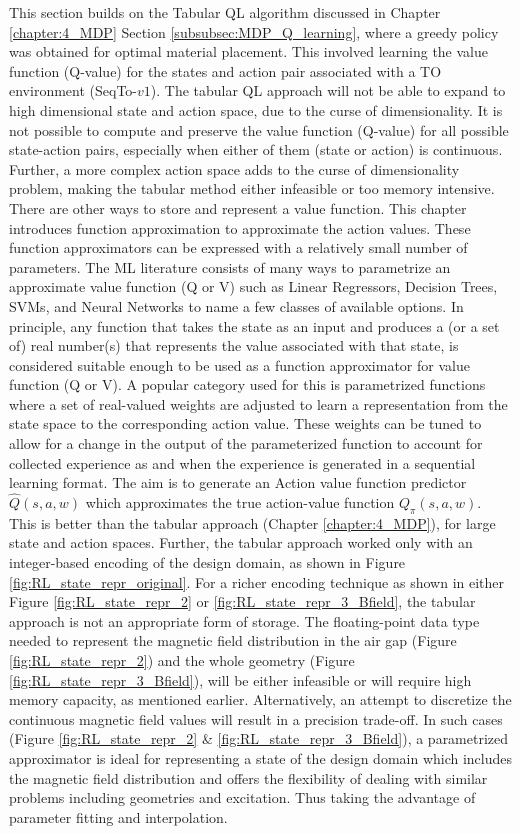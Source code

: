 This section builds on the Tabular QL algorithm discussed in Chapter \ref{chapter:4_MDP} Section \ref{subsubsec:MDP_Q_learning}, where a greedy policy was obtained for optimal material placement. This involved learning the value function (Q-value) for the states and action pair associated with a TO environment (SeqTo-$v1$). The tabular QL approach will not be able to expand to high dimensional state and action space, due to the curse of dimensionality. It is not possible to compute and preserve the  value function (Q-value) for all possible state-action pairs, especially when either of them (state or action) is continuous. Further, a more complex action space adds to the curse of dimensionality problem, making the tabular method either infeasible or too memory intensive. There are other ways to store and represent a value function. This chapter introduces function approximation to approximate the action values. These function approximators can be expressed with a relatively small number of parameters.  The ML literature consists of many ways to parametrize an approximate value function (Q or V) such as Linear Regressors, Decision Trees, SVMs, and Neural Networks to name a few classes of available options. In principle, any function that takes the state as an input and produces a (or a set of) real number(s) that represents the value associated with that state, is considered suitable enough to be used as a function approximator for value function (Q or V). A popular category used for this is parametrized functions where a set of real-valued weights are adjusted to learn a representation from the state space to the corresponding action value. These weights can be tuned to allow for a change in the output of the parameterized function to account for collected experience as and when the experience is generated in a sequential learning format. The aim is to generate an Action value function predictor $\hat{Q}(s,a, w)$ which approximates the true action-value function $Q_{\pi}(s,a, w)$. This is better than the tabular approach (Chapter \ref{chapter:4_MDP}), for large state and action spaces. 
Further, the tabular approach worked only with an integer-based encoding of the design domain, as shown in Figure \ref{fig:RL_state_repr_original}. For a richer encoding technique as shown in either Figure \ref{fig:RL_state_repr_2} or \ref{fig:RL_state_repr_3_Bfield}, the tabular approach is not an appropriate form of storage. The floating-point data type needed to represent the magnetic field distribution in the air gap (Figure \ref{fig:RL_state_repr_2}) and the whole geometry (Figure \ref{fig:RL_state_repr_3_Bfield}), will be either infeasible or will require high memory capacity, as mentioned earlier. Alternatively, an attempt to discretize the continuous magnetic field values will result in a precision trade-off. In such cases (Figure \ref{fig:RL_state_repr_2} \& \ref{fig:RL_state_repr_3_Bfield}), a parametrized approximator is ideal for representing a state of the design domain which includes the magnetic field distribution and offers the flexibility of dealing with similar problems including geometries and excitation. Thus taking the advantage of parameter fitting and interpolation.

